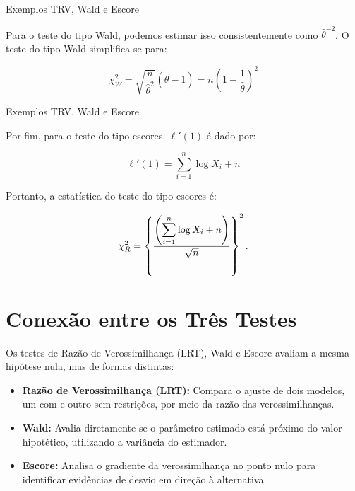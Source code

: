 \documentclass[12pt]{beamer}
\begin{document}
\begin{frame}{Exemplos TRV, Wald e Escore}
\begin{block}{}
\justifying
Para o teste do tipo Wald, podemos estimar isso consistentemente como \(\hat{\theta}^{-2}\). O teste do tipo Wald simplifica-se para:

\[\chi^2_W = \sqrt{\dfrac{n}{\hat{\theta}^{2}}}(\hat{\theta}-1)=n\left(1 - \frac{1}{\hat{\theta}}\right)^2\]
\end{block}
\end{frame}


\begin{frame}{Exemplos TRV, Wald e Escore}
\begin{block}{}
\justifying
Por fim, para o teste do tipo escores, \(\ell'(1)\) é dado por:

\[\ell'(1) = \sum_{i=1}^n \log X_i + n\]

Portanto, a estatística do teste do tipo escores é:

\[\chi^2_R = \left\{\dfrac{\left({\displaystyle \sum_{i=1}^{n}} \log X_i + n\right)}{\sqrt{n}}\right\}^{2}.\]
\end{block}
\end{frame}

\section{Conexão entre os Três Testes}
\begin{frame}
	\begin{block}{}
\justifying		
		Os testes de Razão de Verossimilhança (LRT), Wald e Escore avaliam a mesma hipótese nula, mas de formas distintas:
		
		\begin{itemize}
			\justifying
			\item \textbf{Razão de Verossimilhança (LRT):} Compara o ajuste de dois modelos, um com e outro sem restrições, por meio da razão das verossimilhanças.\pause
			\item \textbf{Wald:} Avalia diretamente se o parâmetro estimado está próximo do valor hipotético, utilizando a variância do estimador.\pause
			\item \textbf{Escore:} Analisa o gradiente da verossimilhança no ponto nulo para identificar evidências de desvio em direção à alternativa.
		\end{itemize}
	\end{block}
\end{frame}
\end{document}
